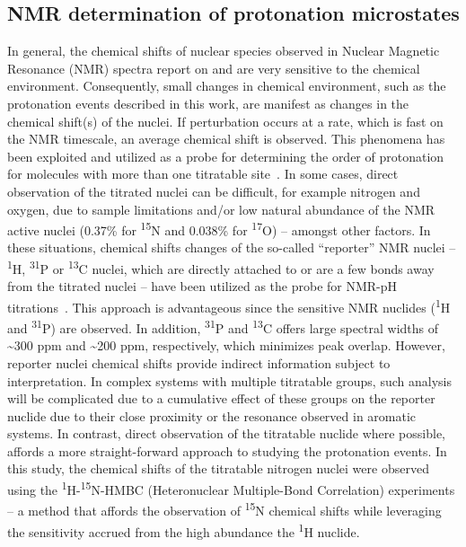 \documentclass[9pt,lineno]{elife}
\begin{document}
\subsection{NMR determination of protonation microstates}
In general, the chemical shifts of nuclear species observed in Nuclear Magnetic Resonance (NMR) spectra report on and are very sensitive to the chemical environment. Consequently, small changes in chemical environment, such as the protonation events described in this work, are manifest as changes in the chemical shift(s) of the nuclei. If perturbation occurs at a rate, which is fast on the NMR timescale, an average chemical shift is observed. This phenomena has been exploited and utilized as a probe for determining the order of protonation for molecules with more than one titratable site~\citep{NMR1_szakacs_acidbase_2005}.
In some cases, direct observation of the titrated nuclei can be difficult, for example nitrogen and oxygen, due to sample limitations and/or low natural abundance of the NMR active nuclei (0.37\% for \textsuperscript{15}N and 0.038\% for \textsuperscript{17}O) – amongst other factors. 
In these situations, chemical shifts changes of the so-called “reporter” NMR nuclei – \textsuperscript{1}H, \textsuperscript{31}P or \textsuperscript{13}C nuclei, which are directly attached to or are a few bonds away from the titrated nuclei – have been utilized as the probe for NMR-pH titrations~\citep{NMR2_szakcs_determination_2004, NMR3_dozol_inframolecular_2002, bezencon_pka_2014}.
This approach is advantageous since the sensitive NMR nuclides (\textsuperscript{1}H and \textsuperscript{31}P) are observed. In addition, \textsuperscript{31}P and \textsuperscript{13}C offers large spectral widths of \textasciitilde300 ppm and \textasciitilde200 ppm, respectively, which minimizes peak overlap. However, reporter nuclei chemical shifts provide indirect information subject to interpretation. In complex systems with multiple titratable groups, such analysis will be complicated due to a cumulative effect of these groups on the reporter nuclide due to their close proximity or the resonance observed in aromatic systems. In contrast, direct observation of the titratable nuclide where possible, affords a more straight-forward approach to studying the protonation events.
In this study, the chemical shifts of the titratable nitrogen nuclei were observed using the \textsuperscript{1}H-\textsuperscript{15}N-HMBC (Heteronuclear Multiple-Bond Correlation) experiments – a method that affords the observation of \textsuperscript{15}N chemical shifts while leveraging the sensitivity accrued from the high abundance the \textsuperscript{1}H nuclide.
\end{document}
